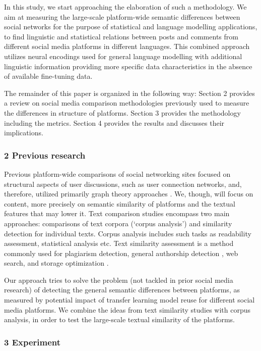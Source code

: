 In this study, we start approaching the elaboration of such a methodology. We aim at measuring the large-scale platform-wide semantic differences between social networks for the purpose of statistical and language modelling applications, to find linguistic and statistical relations between posts and comments from different social media platforms in different languages. This combined approach utilizes neural encodings used for general language modelling with additional linguistic information providing more specific data characteristics in the absence of available fine-tuning data.

The remainder of this paper is organized in the following way: Section 2 provides a review on social media comparison methodologies previously used to measure the differences in structure of platforms. Section 3 provides the methodology including the metrics. Section 4 provides the results and discusses their implications.

\subsubsection{2 Previous research}

Previous platform-wide comparisons of social networking sites focused on structural aspects of user discussions, such as user connection networks, and, therefore, utilized primarily graph theory approaches \cite{GuzmanDeckroRobbins}. We, though, will focus on content, more precisely on semantic similarity of platforms and the textual features that may lower it.
Text comparison studies encompass two main approaches: comparisons of text corpora (‘corpus analysis’) and similarity detection for individual texts. Corpus analysis includes such tasks as readability assessment, statistical analysis etc. Text similarity assessment is a method commonly used for plagiarism detection, general authorship detection \cite{KoppelSchlerArgamon}, web search, and storage optimization \cite{Sitio}. 

Our approach tries to solve the problem (not tackled in prior social media research) of detecting the general semantic differences between platforms, as measured by potential impact of transfer learning model reuse for different social media platforms. We combine the ideas from text similarity studies with corpus analysis, in order to test the large-scale textual similarity of the platforms.

\subsubsection{3 Experiment}

